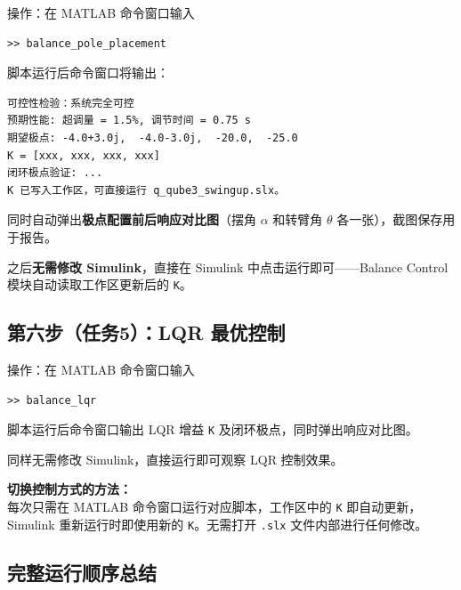 \documentclass[12pt, a4paper]{article}
\begin{document}
\begin{stepbox}{操作：在 MATLAB 命令窗口输入}
\begin{lstlisting}[style=matlab]
>> balance_pole_placement
\end{lstlisting}
\end{stepbox}

脚本运行后命令窗口将输出：
\begin{lstlisting}[style=matlab, numbers=none]
可控性检验：系统完全可控
预期性能: 超调量 = 1.5%, 调节时间 = 0.75 s
期望极点: -4.0+3.0j,  -4.0-3.0j,  -20.0,  -25.0
K = [xxx, xxx, xxx, xxx]
闭环极点验证: ...
K 已写入工作区，可直接运行 q_qube3_swingup.slx。
\end{lstlisting}

同时自动弹出\textbf{极点配置前后响应对比图}（摆角 $\alpha$ 和转臂角 $\theta$ 各一张），截图保存用于报告。

之后\textbf{无需修改 Simulink}，直接在 Simulink 中点击运行即可——Balance Control 模块自动读取工作区更新后的 \texttt{K}。

\subsection{第六步（任务5）：LQR 最优控制}

\begin{stepbox}{操作：在 MATLAB 命令窗口输入}
\begin{lstlisting}[style=matlab]
>> balance_lqr
\end{lstlisting}
\end{stepbox}

脚本运行后命令窗口输出 LQR 增益 \texttt{K} 及闭环极点，同时弹出响应对比图。

同样无需修改 Simulink，直接运行即可观察 LQR 控制效果。

\begin{notebox}
\textbf{切换控制方式的方法：}\\
每次只需在 MATLAB 命令窗口运行对应脚本，工作区中的 \texttt{K} 即自动更新，Simulink 重新运行时即使用新的 \texttt{K}。无需打开 \texttt{.slx} 文件内部进行任何修改。
\end{notebox}

\subsection{完整运行顺序总结}
\end{document}
